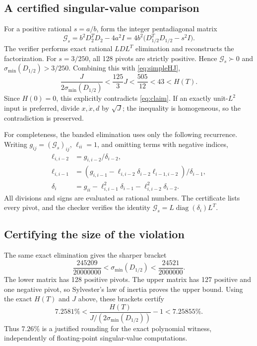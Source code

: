 \documentclass[11pt,letterpaper]{article}
\newcommand{\sig}{\sigma_{\min}}
\begin{document}
\subsection*{A certified singular-value comparison}
For a positive rational $s=a/b$, form the integer pentadiagonal matrix
\[
 \mathcal G_s=b^2D_2^TD_2-4a^2I
             =4b^2\big(D_{1/2}^TD_{1/2}-s^2I\big).
\]
The verifier performs exact rational $LDL^T$ elimination and reconstructs the
factorization. For $s=3/250$, all 128 pivots are strictly positive. Hence
$\mathcal G_s\succ0$ and $\sig(D_{1/2})>3/250$. Combining this with
\eqref{eq:simpleHJ},
\begin{equation}\label{eq:zero-contradiction}
 \frac{J}{2\sig(D_{1/2})}
 <\frac{125}{3}J
 <\frac{505}{12}
 <43<H(T).
\end{equation}
Since $H(0)=0$, this explicitly contradicts \eqref{eq:claim}.
If an exactly unit-$L^2$ input is preferred, divide $x,\dot x,d$ by $\sqrt J$;
the inequality is homogeneous, so the contradiction is preserved.

For completeness, the banded elimination uses only the following recurrence.
Writing $g_{ij}=(\mathcal G_s)_{ij}$, $\ell_{ii}=1$, and omitting terms with
negative indices,
\begin{align*}
 \ell_{i,i-2}&=g_{i,i-2}/\delta_{i-2},\\
 \ell_{i,i-1}&=(g_{i,i-1}-\ell_{i,i-2}\delta_{i-2}\ell_{i-1,i-2})/\delta_{i-1},\\
 \delta_i&=g_{ii}-\ell_{i,i-1}^2\delta_{i-1}
                     -\ell_{i,i-2}^2\delta_{i-2}.
\end{align*}
All divisions and signs are evaluated as rational numbers. The certificate
lists every pivot, and the checker verifies the identity
$\mathcal G_s=L\operatorname{diag}(\delta_i)L^T$.

\subsection*{Certifying the size of the violation}
The same exact elimination gives the sharper bracket
\[
 \frac{245209}{20000000}<\sig(D_{1/2})<\frac{24521}{2000000}.
\]
The lower matrix has 128 positive pivots. The upper matrix has 127 positive
and one negative pivot, so Sylvester's law of inertia proves the upper bound.
Using the exact $H(T)$ and $J$ above, these brackets certify
\[
 7.2581\%
 <\frac{H(T)}{J/(2\sig(D_{1/2}))}-1
 <7.25855\%.
\]
Thus $7.26\%$ is a justified rounding for the exact polynomial witness,
independently of floating-point singular-value computations.
\end{document}
